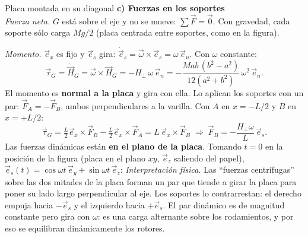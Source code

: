 \begin{solucion}{Placa montada en su diagonal}
\textbf{c) Fuerzas en los soportes}\\
\emph{Fuerza neta.} $G$ está sobre el eje y no se mueve: $\sum\vec{F} = \vec{0}$. Con gravedad, cada soporte sólo carga $Mg/2$ (placa centrada entre soportes, como en la figura).

\emph{Momento.} $\vec{e}_x$ es fijo y $\vec{e}_s$ gira: $\dot{\vec{e}}_s = \vec{\omega}\times\vec{e}_s = \omega\,\vec{e}_n$. Con $\omega$ constante:
\[
\vec{\tau}_G = \dot{\vec{H}}_G = \vec{\omega}\times\vec{H}_G = -H_\perp\,\omega\,\vec{e}_n
= -\frac{M ab\,(b^2-a^2)}{12(a^2+b^2)}\,\omega^2\,\vec{e}_n.
\]
El momento es \textbf{normal a la placa} y gira con ella. Lo aplican los soportes con un par: $\vec{F}_A=-\vec{F}_B$, ambos perpendiculares a la varilla. Con $A$ en $x=-L/2$ y $B$ en $x=+L/2$:
\[
\vec{\tau}_G = \tfrac L2\vec{e}_x\times\vec{F}_B - \tfrac L2\vec{e}_x\times\vec{F}_A = L\,\vec{e}_x\times\vec{F}_B
\;\Rightarrow\;
\vec{F}_B = -\frac{H_\perp\omega}{L}\,\vec{e}_s.
\]
Las fuerzas dinámicas están \textbf{en el plano de la placa}. Tomando $t=0$ en la posición de la figura (placa en el plano $xy$, $\vec{e}_z$ saliendo del papel), $\vec{e}_s(t)=\cos\omega t\,\vec{e}_y+\sin\omega t\,\vec{e}_z$:
\emph{Interpretación física.} Las ``fuerzas centrífugas'' sobre las dos mitades de la placa forman un par que tiende a girar la placa para poner su lado largo perpendicular al eje. Los soportes lo contrarrestan: el derecho empuja hacia $-\vec{e}_s$ y el izquierdo hacia $+\vec{e}_s$. El par dinámico es de magnitud constante pero gira con $\omega$: es una carga alternante sobre los rodamientos, y por eso se equilibran dinámicamente los rotores.



\end{solucion}
